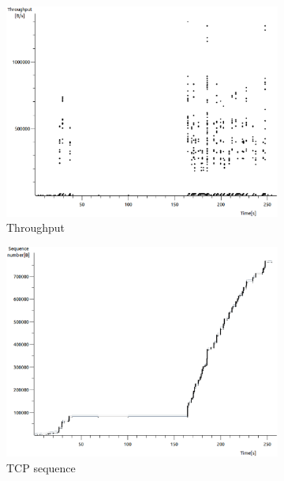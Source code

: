 \documentclass[conference,a4paper]{IEEEtran}
\begin{document}
\begin{figure}
 \centering
 \begin{subfigure}[b]{0.2\textwidth}
  \includegraphics[width=\textwidth]{s8-1_th}
  \caption{Throughput}
 \end{subfigure}
 \begin{subfigure}[b]{0.2\textwidth}
  \includegraphics[width=\textwidth]{s8-1_seq}
  \caption{TCP sequence}
 \end{subfigure}
 \begin{subfigure}[b]{0.2\textwidth}

\end{subfigure}
\end{figure}
\end{document}
